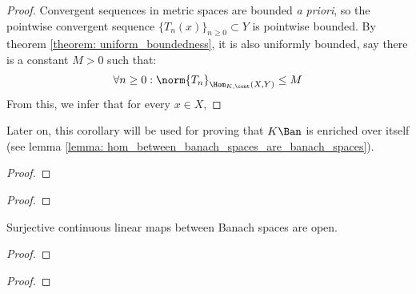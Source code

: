             \begin{proof}
                Convergent sequences in metric spaces are bounded \textit{a priori}, so the pointwise convergent sequence $\{T_n(x)\}_{n \geq 0} \subset Y$ is pointwise bounded. By theorem \ref{theorem: uniform_boundedness}, it is also uniformly bounded, say there is a constant $M > 0$ such that:
                    $$\forall n \geq 0: \norm{T_n}_{\Hom_{K, \cont}(X, Y)} \leq M$$
                From this, we infer that for every $x \in X$,

            \end{proof}
        Later on, this corollary will be used for proving that $K\-\Ban$ is enriched over itself (see lemma \ref{lemma: hom_between_banach_spaces_are_banach_spaces}).

        \begin{proposition} \label{prop: compact_linear_maps}
        \end{proposition}
            \begin{proof}
                
            \end{proof}

        \begin{proposition} \label{prop: weakly_bounded_sequences}
        \end{proposition}
            \begin{proof}
                
            \end{proof}

        \begin{theorem} \label{theorem: open_mapping}
            Surjective continuous linear maps between Banach spaces are open.
        \end{theorem}
            \begin{proof}
            \end{proof}

        \begin{theorem} \label{theorem: closed_graph}
        \end{theorem}
            \begin{proof}
                
            \end{proof}

